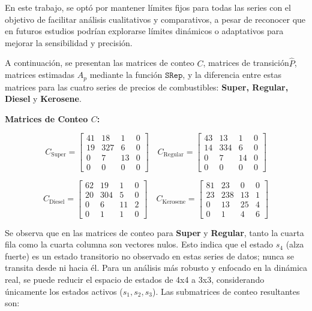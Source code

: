 \begin{examplex}
\bigskip
En este trabajo, se optó por mantener límites fijos para todas las series con el objetivo de facilitar análisis cualitativos y comparativos, a pesar de reconocer que en futuros estudios podrían explorarse límites dinámicos o adaptativos para mejorar la sensibilidad y precisión.

\bigskip
A continuación, se presentan las matrices de conteo \( C \), matrices de transición\( \hat{P} \), matrices estimadas \( A_p \) mediante la función \( \texttt{SRep} \), y la diferencia entre estas matrices para las cuatro series de precios de combustibles: \textbf{Super, Regular, Diesel} y \textbf{Kerosene}.

\bigskip
\noindent\textbf{Matrices de Conteo \(C\):}

\[
C_{\text{Super}} = \begin{bmatrix}
41 & 18 & 1 & 0 \\
19 & 327 & 6 & 0 \\
0 & 7 & 13 & 0 \\
0 & 0 & 0 & 0
\end{bmatrix}
\quad
C_{\text{Regular}} = \begin{bmatrix}
43 & 13 & 1 & 0 \\
14 & 334 & 6 & 0 \\
0 & 7 & 14 & 0 \\
0 & 0 & 0 & 0
\end{bmatrix}
\]

\[
C_{\text{Diesel}} = \begin{bmatrix}
62 & 19 & 1 & 0 \\
20 & 304 & 5 & 0 \\
0 & 6 & 11 & 2 \\
0 & 1 & 1 & 0
\end{bmatrix}
\quad
C_{\text{Kerosene}} = \begin{bmatrix}
81 & 23 & 0 & 0 \\
23 & 238 & 13 & 1 \\
0 & 13 & 25 & 4 \\
0 & 1 & 4 & 6
\end{bmatrix}
\]

Se observa que en las matrices de conteo para \textbf{Super} y \textbf{Regular}, tanto la cuarta fila como la cuarta columna son vectores nulos. Esto indica que el estado \(s_4\) (alza fuerte) es un estado transitorio no observado en estas series de datos; nunca se transita desde ni hacia él. Para un análisis más robusto y enfocado en la dinámica real, se puede reducir el espacio de estados de 4x4 a 3x3, considerando únicamente los estados activos (\(s_1, s_2, s_3\)). Las submatrices de conteo resultantes son:


\end{examplex}
